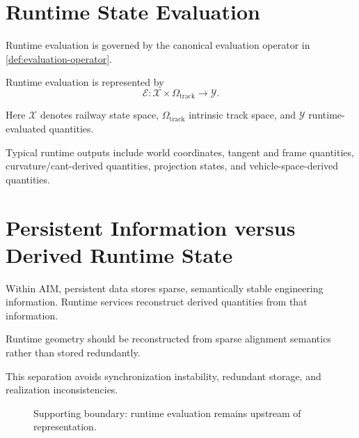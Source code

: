 \section{Runtime State Evaluation}

Runtime evaluation is governed by the canonical evaluation operator in
\cref{def:evaluation-operator}.

\begin{definition}
\label{def:runtime-evaluation}
Runtime evaluation is represented by
\[
\mathcal E
:
\mathcal X
\times
\Omega_{\mathrm{track}}
\rightarrow
\mathcal Y.
\]
\end{definition}

Here \(\mathcal X\) denotes railway state space,
\(\Omega_{\mathrm{track}}\) intrinsic track space, and
\(\mathcal Y\) runtime-evaluated quantities.

Typical runtime outputs include world coordinates, tangent and frame
quantities, curvature/cant-derived quantities, projection states, and
vehicle-space-derived quantities.

\section{Persistent Information versus Derived Runtime State}

Within AIM, persistent data stores sparse, semantically stable
engineering information. Runtime services reconstruct derived quantities
from that information.

\begin{principle}
\label{princ:runtime-reconstruction}
Runtime geometry should be reconstructed from sparse alignment semantics
rather than stored redundantly.
\end{principle}

This separation avoids synchronization instability, redundant storage,
and realization inconsistencies.

\begin{figure}[ht]
\centering

\caption{Supporting boundary: runtime evaluation remains upstream of representation.}
\label{fig:support-runtime-representation-boundary}
\end{figure}

